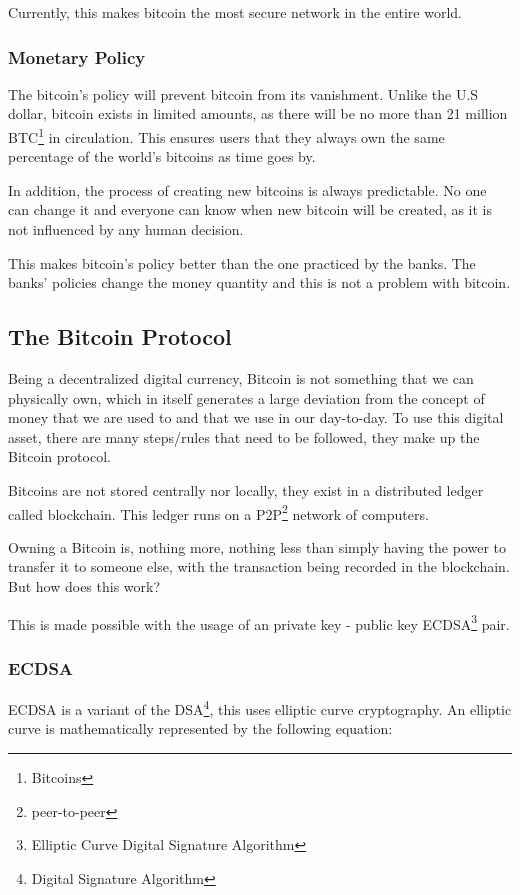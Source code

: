 \documentclass{article}
\newcommand\tab[1][1cm]{\hspace*{#1}}
\begin{document}
 Currently, this makes bitcoin the most secure network in the entire world. 
 
\subsubsection{Monetary Policy}

\tab The bitcoin's policy will prevent bitcoin from its vanishment. Unlike the U.S dollar, bitcoin exists in limited amounts, as there will be no more than 21 million BTC\footnote{Bitcoins} in circulation. This ensures users that they always own the same percentage of the world's bitcoins as time goes by.

In addition, the process of creating new bitcoins is always predictable. No one can change it and everyone can know when new bitcoin will be created, as it is not influenced by any human decision. 

This makes bitcoin's policy better than the one practiced by the banks. The banks' policies change the money quantity and this is not a problem with bitcoin.

\subsection{The Bitcoin Protocol}

\tab Being a decentralized digital currency, Bitcoin is not something that we can physically own, which in itself generates a large deviation from the concept of money that we are used to and that we use in our day-to-day. To use this digital asset, there are many steps/rules that need to be followed, they make up the Bitcoin protocol.

Bitcoins are not stored centrally nor locally, they exist in a distributed ledger called blockchain. This ledger runs on a P2P\footnote{peer-to-peer} network of computers. 

Owning a Bitcoin is, nothing more, nothing less than simply having the power to transfer it to someone else, with the transaction being recorded in the blockchain. But how does this work?

This is made possible with the usage of an private key - public key ECDSA\footnote{Elliptic Curve Digital Signature Algorithm} pair.

\subsubsection{ECDSA}

\tab ECDSA is a variant of the DSA\footnote{Digital Signature Algorithm}, this uses elliptic curve cryptography. An elliptic curve is mathematically represented by the following equation:
\end{document}
